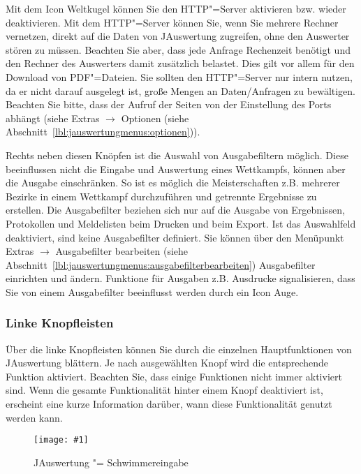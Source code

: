 \documentclass[11pt,a4paper,twoside,ngerman]{article}
\newcommand{\hsmimage}[3]{\begin{figure}[!ht]\centering\texttt{[image: \#1]}\caption{#3}\end{figure}}
\begin{document}
Mit dem Icon \glqq{}Weltkugel\grqq{} können Sie den HTTP"=Server aktivieren bzw. wieder deaktivieren. Mit dem HTTP"=Server können Sie, wenn Sie mehrere Rechner vernetzen, direkt auf die Daten von JAuswertung zugreifen, ohne den Auswerter stören zu müssen. Beachten Sie aber, dass jede Anfrage Rechenzeit benötigt und den Rechner des Auswerters damit zusätzlich belastet. Dies gilt vor allem für den Download von PDF"=Dateien. Sie sollten den HTTP"=Server nur intern nutzen, da er nicht darauf ausgelegt ist, große Mengen an Daten/Anfragen zu bewältigen. Beachten Sie bitte, dass der Aufruf der Seiten von der Einstellung des Ports abhängt (siehe Extras \ensuremath{\rightarrow} Optionen (siehe Abschnitt~\ref{lbl:jauswertungmenus:optionen})).

\label{lbl:knopfleisteoben:ausgabefilter}Rechts neben diesen Knöpfen ist die Auswahl von \glqq{}Ausgabefiltern\grqq{} möglich. Diese beeinflussen nicht die Eingabe und Auswertung eines Wettkampfs, können aber die Ausgabe einschränken. So ist es möglich die Meisterschaften z.B. mehrerer Bezirke in einem Wettkampf durchzuführen und getrennte Ergebnisse zu erstellen. Die Ausgabefilter beziehen sich nur auf die Ausgabe von Ergebnissen, Protokollen und Meldelisten beim Drucken und beim Export. Ist das Auswahlfeld deaktiviert, sind keine Ausgabefilter definiert. Sie können über den Menüpunkt Extras \ensuremath{\rightarrow} Ausgabefilter bearbeiten (siehe Abschnitt~\ref{lbl:jauswertungmenus:ausgabefilterbearbeiten}) Ausgabefilter einrichten und ändern. Funktione für Ausgaben z.B. Ausdrucke signalisieren, dass Sie von einem Ausgabefilter beeinflusst werden durch ein Icon \glqq{}Auge\grqq{}.


\newpage

\subsubsection{Linke Knopfleisten}
\label{lbl:knopfleistenlinks::begin}
\label{lbl:knopfleistenlinks:linkeknopfleiste}Über die linke Knopfleisten können Sie durch die einzelnen Hauptfunktionen von JAuswertung blättern. Je nach ausgewählten Knopf wird die entsprechende Funktion aktiviert. Beachten Sie, dass einige Funktionen nicht immer aktiviert sind. Wenn die gesamte Funktionalität hinter einem Knopf deaktiviert ist, erscheint eine kurze Information darüber, wann diese Funktionalität genutzt werden kann.


\hsmimage{pics/panel-anmeldung}{.50\textwidth}{JAuswertung "= Schwimmereingabe}
\end{document}
